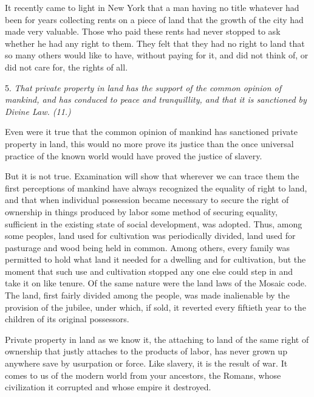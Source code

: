 \documentclass{book}
\begin{document}
It recently came to light in New York that a man having no title whatever had been for years collecting rents on a piece of land that the growth of the city had made very valuable. Those who paid these rents had never stopped to ask whether he had any right to them. They felt that they had no right to land that so many others would like to have, without paying for it, and did not think of, or did not care for, the rights of all.

5. \emph{That private property in land has the support of the common opinion of mankind, and has conduced to peace and tranquillity, and that it is sanctioned by Divine Law. (11.)}

Even were it true that the common opinion of mankind has sanctioned private property in land, this would no more prove its justice than the once universal practice of the known world would have proved the justice of slavery.

But it is not true. Examination will show that wherever we can trace them the first perceptions of mankind have always recognized the equality of right to land, and that when individual possession became necessary to secure the right of ownership in things produced by labor some method of securing equality, sufficient in the existing state of social development, was adopted. Thus, among some peoples, land used for cultivation was periodically divided, land used for pasturage and wood being held in common. Among others, every family was permitted to hold what land it needed for a dwelling and for cultivation, but the moment that such use and cultivation stopped any one else could step in and take it on like tenure. Of the same nature were the land laws of the Mosaic code. The land, first fairly divided among the people, was made inalienable by the provision of the jubilee, under which, if sold, it reverted every fiftieth year to the children of its original possessors.

Private property in land as we know it, the attaching to land of the same right of ownership that justly attaches to the products of labor, has never grown up anywhere save by usurpation or force. Like slavery, it is the result of war. It comes to us of the modern world from your ancestors, the Romans, whose civilization it corrupted and whose empire it destroyed.
\end{document}
